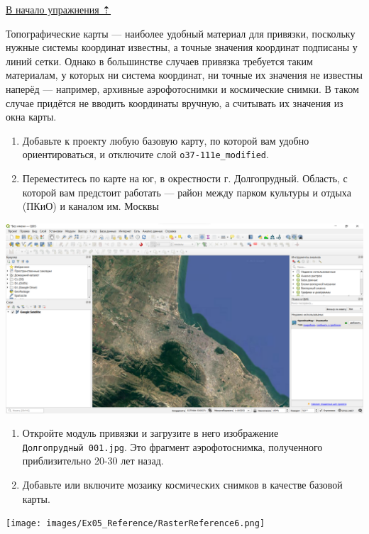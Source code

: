 \documentclass[
  12pt,
]{book}
\begin{document}
\protect\hyperlink{raster-reference}{В начало упражнения ⇡}

Топографические карты --- наиболее удобный материал для привязки, поскольку нужные системы координат известны, а точные значения координат подписаны у линий сетки. Однако в большинстве случаев привязка требуется таким материалам, у которых ни система координат, ни точные их значения не известны наперёд --- например, архивные аэрофотоснимки и космические снимки. В таком случае придётся не вводить координаты вручную, а считывать их значения из окна карты.

\begin{enumerate}
\def\labelenumi{\arabic{enumi}.}
\item
  Добавьте к проекту любую базовую карту, по которой вам удобно ориентироваться, и отключите слой \texttt{o37-111e\_modified}.
\item
  Переместитесь по карте на юг, в окрестности г. Долгопрудный. Область, с которой вам предстоит работать --- район между парком культуры и отдыха (ПКиО) и каналом им. Москвы
\end{enumerate}

\includegraphics{images/Ex05_Reference/RasterReference5.png}

\begin{enumerate}
\def\labelenumi{\arabic{enumi}.}
\setcounter{enumi}{2}
\item
  Откройте модуль привязки и загрузите в него изображение \texttt{Долгопрудный\ 001.jpg}. Это фрагмент аэрофотоснимка, полученного приблизительно 20-30 лет назад.
\item
  Добавьте или включите мозаику космических снимков в качестве базовой карты.
\end{enumerate}

\texttt{[image: images/Ex05\_Reference/RasterReference6.png]}
\end{document}
